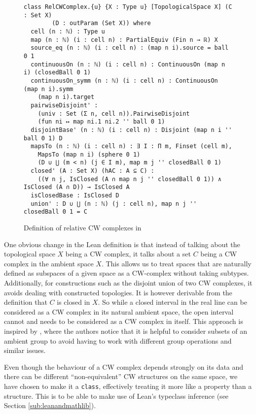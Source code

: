 \begin{figure}
\caption{Definition of relative CW complexes in \mathlib}
\label{fig:def}
\begin{lstlisting}[frame=single]
class RelCWComplex.{u} {X : Type u} [TopologicalSpace X] (C : Set X) 
        (D : outParam (Set X)) where
  cell (n : ℕ) : Type u
  map (n : ℕ) (i : cell n) : PartialEquiv (Fin n → ℝ) X
  source_eq (n : ℕ) (i : cell n) : (map n i).source = ball 0 1
  continuousOn (n : ℕ) (i : cell n) : ContinuousOn (map n i) (closedBall 0 1)
  continuousOn_symm (n : ℕ) (i : cell n) : ContinuousOn (map n i).symm 
    (map n i).target
  pairwiseDisjoint' :
    (univ : Set (Σ n, cell n)).PairwiseDisjoint 
    (fun ni ↦ map ni.1 ni.2 '' ball 0 1)
  disjointBase' (n : ℕ) (i : cell n) : Disjoint (map n i '' ball 0 1) D
  mapsTo (n : ℕ) (i : cell n) : ∃ I : Π m, Finset (cell m),
    MapsTo (map n i) (sphere 0 1) 
    (D ∪ ⋃ (m < n) (j ∈ I m), map m j '' closedBall 0 1)
  closed' (A : Set X) (hAC : A ⊆ C) :
    ((∀ n j, IsClosed (A ∩ map n j '' closedBall 0 1)) ∧ IsClosed (A ∩ D)) → IsClosed A
  isClosedBase : IsClosed D
  union' : D ∪ ⋃ (n : ℕ) (j : cell n), map n j '' closedBall 0 1 = C
\end{lstlisting}
\end{figure}

One obvious change in the Lean definition is that instead of talking about the topological space $X$ being a CW complex, it talks about a set $C$ being a CW complex in the ambient space $X$.
This allows us to treat spaces that are naturally defined as subspaces of a given space as a CW-complex without taking subtypes. 
Additionally, for constructions such as the disjoint union of two CW complexes, it avoids dealing with constructed topologies.
It is however derivable from the definition that $C$ is closed in $X$. 
So while a closed interval in the real line can be considered as a CW complex in its natural ambient space, the open interval cannot and needs to be considered as a CW complex in itself. 
This approach is inspired by \cite{Gonthier2013}, where the authors notice that it is helpful to consider subsets of an ambient group to avoid having to work with different group operations and similar issues.

Even though the behaviour of a CW complex depends strongly on its data and there can be different ``non-equivalent'' CW structures on the same space, we have chosen to make it a \lstinline|class|, effectively treating it more like a property than a structure. 
This is to be able to make use of Lean's typeclass inference (see Section \ref{sub:leanandmathlib}).


